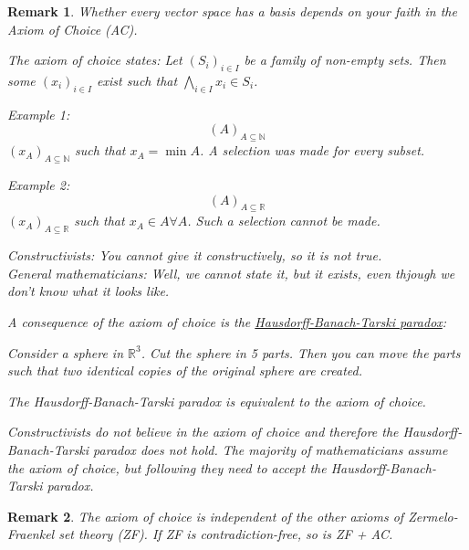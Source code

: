 \documentclass[a4paper,landscape,twocolumn]{article}
\newtheorem{rem}{Remark}[section]
\begin{document}
\begin{rem}
  Whether every vector space has a basis depends on your faith in the Axiom of Choice (AC).

  The axiom of choice states: Let $(S_i)_{i \in I}$ be a family of non-empty sets.
  Then some $(x_i)_{i \in I}$ exist such that $\bigwedge_{i \in I} x_i \in S_i$.

  Example 1:
  \[ (A)_{A \subseteq \mathbb N} \]
  $(x_A)_{A \subseteq \mathbb N}$ such that $x_A = \min{A}$.
  A selection was made for every subset.

  Example 2:
  \[ (A)_{A \subseteq \mathbb R} \]
  $(x_A)_{A \subseteq \mathbb R}$ such that $x_A \in A \forall A$.
  Such a selection cannot be made.

  Constructivists: You cannot give it constructively, so it is not true. \\
  General mathematicians: Well, we cannot state it, but it exists,
  even thjough we don't know what it looks like.

  A consequence of the axiom of choice is the \href{https://en.wikipedia.org/wiki/Banach%E2%80%93Tarski_paradox}{Hausdorff-Banach-Tarski paradox}:

  Consider a sphere in $\mathbb R^3$.
  Cut the sphere in 5 parts.
  Then you can move the parts such that two identical copies of the original sphere are created.

  The Hausdorff-Banach-Tarski paradox is equivalent to the axiom of choice.

  Constructivists do not believe in the axiom of choice and therefore the Hausdorff-Banach-Tarski paradox does not hold.
  The majority of mathematicians assume the axiom of choice, but following they need to accept the Hausdorff-Banach-Tarski paradox.
\end{rem}

\begin{rem}
  The axiom of choice is independent of the other axioms of Zermelo-Fraenkel set theory (ZF).
  If ZF is contradiction-free, so is ZF + AC.
\end{rem}
\end{document}
